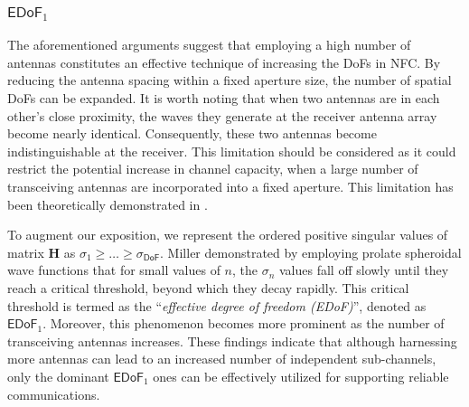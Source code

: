 \documentclass[journal]{IEEEtran}
\theoremstyle{definition}
\begin{document}
\subsubsection{${\mathsf{EDoF}}_1$}
The aforementioned arguments suggest that employing a high number of antennas constitutes an effective technique of increasing the DoFs in NFC. By reducing the antenna spacing within a fixed aperture size, the number of spatial DoFs can be expanded. It is worth noting that when two antennas are in each other's close proximity, the waves they generate at the receiver antenna array become nearly identical. Consequently, these two antennas become indistinguishable at the receiver. This limitation should be considered as it could restrict the potential increase in channel capacity, when a large number of transceiving antennas are incorporated into a fixed aperture. This limitation has been theoretically demonstrated in \cite{Miller2000,Dardari2020}.

To augment our exposition, we represent the ordered positive singular values of matrix $\mathbf{H}$ as $\sigma_1\geq\ldots\geq\sigma_{\mathsf{DoF}}$. Miller \cite{Miller2000} demonstrated by employing prolate spheroidal wave functions that for small values of $n$, the $\sigma_n$ values fall off slowly until they reach a critical threshold, beyond which they decay rapidly. This critical threshold is termed as the ``\emph{effective degree of freedom (EDoF)}'', denoted as ${\mathsf{EDoF}}_1$. Moreover, this phenomenon becomes more prominent as the number of transceiving antennas increases. These findings indicate that although harnessing more antennas can lead to an increased number of independent sub-channels, only the dominant ${\mathsf{EDoF}}_1$ ones can be effectively utilized for supporting reliable communications.


\end{document}
